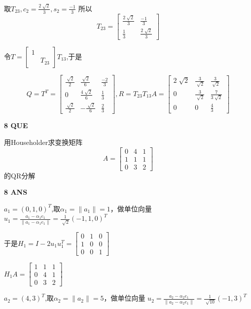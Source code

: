 \documentclass[11pt,letterpaper]{ctexart}
\begin{document}
\begin{enumerate}
取$T_{23}, c_2 = \frac{2\sqrt[]{2}}{3}, s_2 = \frac{-1}{3}$ 所以 \[ T_{23} = \begin{bmatrix}
	\frac{2\sqrt[]{2}}{3} &  \frac{-1}{3} \\
	\frac{1}{3} &  \frac{2\sqrt[]{2}}{3}
\end{bmatrix}\]


令$T = \begin{bmatrix}
	1 \\
	& T_{23}
\end{bmatrix}T_{13}$,于是

\[ Q = T^T = \begin{bmatrix}
	\frac{\sqrt[]{2}}{2} & \frac{\sqrt[]{2}}{6} & \frac{-2}{3} \\
	0 & \frac{4\sqrt[]{2}}{6}  & \frac{1}{3} \\
	\frac{\sqrt[]{2}}{2} & -\frac{\sqrt[]{2}}{6} & \frac{2}{3}
\end{bmatrix}, R = T_{23}T_{13}A =\begin{bmatrix}
	2\sqrt[]{2} & \frac{3}{\sqrt[]{2}} & \frac{3}{\sqrt[]{2}} \\
	0 & \frac{3}{\sqrt[]{2}} & \frac{7}{3\sqrt[]{2}} \\
	0 & 0 & \frac{4}{3}
\end{bmatrix}\]

\textbf{8 QUE}
\bigskip

用Householder求变换矩阵 \[ A = \begin{bmatrix}
	0 & 4 & 1 \\
	1 & 1 & 1 \\
	0 & 3 & 2
\end{bmatrix}\]的QR分解


\textbf{8 ANS}
\bigskip


$a_1 = (0, 1, 0)^T$,取$\alpha_1 = \parallel a_1 \parallel = 1$，做单位向量 $u_1 = \frac{a_1 - \alpha_1 e_1}{\parallel a_1 -\alpha_1 e_1\parallel} =\frac{1}{\sqrt[]{2}}(-1,1, 0)^T$

于是$H_1 = I - 2u_1u_1^T = \begin{bmatrix}
	0 & 1 & 0 \\
	1 & 0 & 0 \\
	0 & 0 & 1
\end{bmatrix}$

$H_1A = \begin{bmatrix}
	1 & 1 & 1 \\
	0 & 4 & 1 \\
	0 & 3 & 2
\end{bmatrix}$

$a_2 = (4,3)^T$,取$\alpha_2 = \parallel a_2 \parallel = 5$，做单位向量 $u_2 = \frac{a_2 - \alpha_2 e_1}{\parallel a_2 -\alpha_2 e_1\parallel} = \frac{1}{\sqrt[]{10}}(-1, 3)^T$


\end{enumerate}
\end{document}
